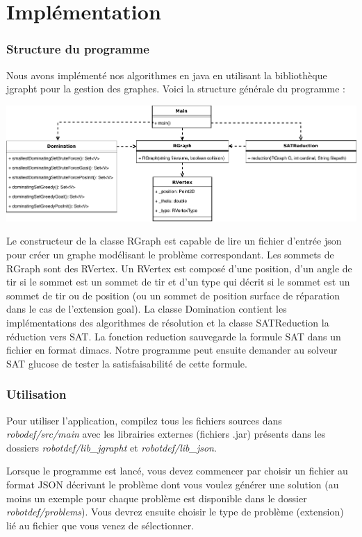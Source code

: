 \part{Implémentation}

\section{Structure du programme}
Nous avons implémenté nos algorithmes en java en utilisant la bibliothèque jgrapht pour la gestion des graphes. Voici la structure générale du programme :\newline

\scalebox{0.7} {
\includegraphics{robotdef.pdf}
} \newline

Le constructeur de la classe RGraph est capable de lire un fichier d'entrée json pour créer un graphe modélisant le problème correspondant. Les sommets de RGraph sont des RVertex. Un RVertex est composé d'une position, d'un angle de tir si le sommet est un sommet de tir et d'un type qui décrit si le sommet est un sommet de tir ou de position (ou un sommet de position surface de réparation dans le cas de l'extension goal). La classe Domination contient les implémentations des algorithmes de résolution et la classe SATReduction la réduction vers SAT. La fonction reduction sauvegarde la formule SAT dans un fichier en format dimacs. Notre programme peut ensuite demander au solveur SAT glucose de tester la satisfaisabilité de cette formule.

\section{Utilisation}

Pour utiliser l'application, compilez tous les fichiers sources dans \textit{robodef/src/main} avec les librairies externes (fichiers .jar) présents dans les dossiers \textit{robotdef/lib\_jgrapht} et \textit{robotdef/lib\_json}.

Lorsque le programme est lancé, vous devez commencer par choisir un fichier au format JSON décrivant le problème dont vous voulez générer une solution (au moins un exemple pour chaque problème est disponible dans le dossier \textit{robotdef/problems}).  Vous devrez ensuite choisir le type de problème (extension) lié au fichier que vous venez de sélectionner.

